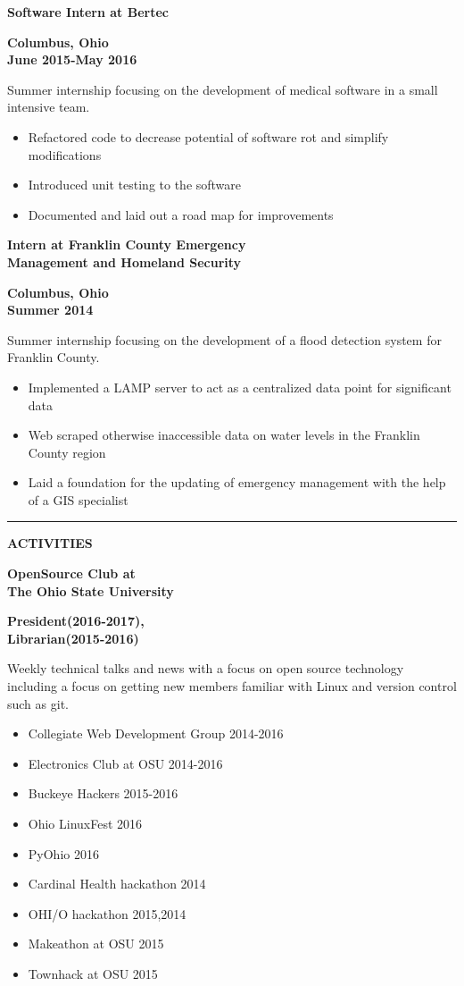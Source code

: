 \documentclass[letterpaper,10pt]{article}
\newcommand{\topic}[1]{\vspace{2mm} \rule[.5em]{10mm}{.2pt} {\large \bfseries #1} \xrfill[.5em]{.2pt} \newline}
\newcommand{\fullentry}[3] { \parbox[t]{.6\textwidth}{\large \bfseries #1} \hfill \parbox[t]{.4\textwidth}{\bfseries \raggedleft #2 \\ #3} \vspace{.5mm} \newline}
\begin{document}
		\fullentry{Software Intern at Bertec}{Columbus, Ohio}{June 2015-May 2016}
			Summer internship focusing on the development of medical software in a small intensive team.
			\begin{itemize}
				\item Refactored code to decrease potential of software rot and simplify modifications
				\item Introduced unit testing to the software
				\item Documented and laid out a road map for improvements
			\end{itemize}
	
		\fullentry{Intern at Franklin County Emergency\\ Management and Homeland Security}{Columbus, Ohio}{Summer 2014}
			Summer internship focusing on the development of a flood detection system for Franklin County.
			\begin{itemize}
				\item Implemented a LAMP server to act as a centralized data point for significant data
				\item Web scraped otherwise inaccessible data on water levels in the Franklin County region
				\item Laid a foundation for the updating of emergency management with the help of a GIS specialist
			\end{itemize}

	\topic{ACTIVITIES}

		\fullentry{OpenSource Club at\\ The Ohio State University}{President(2016-2017),}{Librarian(2015-2016)}
				Weekly technical talks and news with a focus on open source technology including a focus on getting new members familiar with Linux and version control such as git.

		\begin{multicols}{3} \raggedright
			\begin{itemize}
				\item Collegiate Web Development Group 2014-2016
				\item Electronics Club at OSU 2014-2016
				\item Buckeye Hackers 2015-2016
				\item Ohio LinuxFest 2016
				\item PyOhio 2016
				\item Cardinal Health hackathon 2014
				\item OHI/O hackathon 2015,2014
				\item Makeathon at OSU 2015
				\item Townhack at OSU 2015
			\end{itemize}
		\end{multicols}
		
\end{document}
